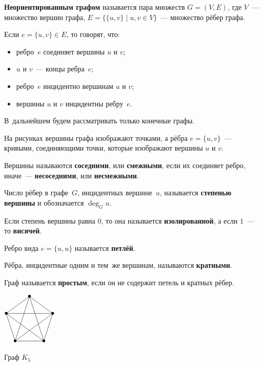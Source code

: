 \textbf{Неориентированным графом} называется пара множеств $G = (V, E)$, где $V$~--- множество вершин графа, $E = \{ \{ u, v \} \mid u, v \in V \}$~--- множество рёбер графа.

Если $e = \{ u, v \} \in E$, то говорят, что:
\begin{itemize}
	\item ребро~$e$ соединяет вершины $u$ и $v$;
	\item $u$ и $v$~--- концы ребра~$e$;
	\item ребро~$e$ инцидентно вершинам $u$ и $v$;
	\item вершины $u$ и $v$ инцидентны ребру~$e$.
\end{itemize}

В~дальнейшем будем рассматривать только конечные графы.

На рисунках вершины графа изображают точками, а рёбра $e = \{ u, v \}$~--- кривыми, соединяющими точки, которые изображают вершины $u$ и $v$.

Вершины называются \textbf{соседними}, или \textbf{смежными}, если их соединяет ребро, иначе~--- \textbf{несоседними}, или \textbf{несмежными}.

 Число рёбер в графе~$G$, инцидентных вершине~$u$, называется \textbf{степенью вершины} и обозначается $\deg_G u$.

Если степень вершины равна $0$, то она называется \textbf{изолированной}, а если $1$~--- то \textbf{висячей}.

 Ребро вида $e = \{ u, u \}$ называется \textbf{петлёй}.

Рёбра, инцидентные одним и тем~же вершинам, называются \textbf{кратными}.

Граф называется \textbf{простым}, если он не содержит петель и кратных рёбер.

\begin{floatingfigure}[r]{30mm} \centering
\noindent
$\begin{xy} /r0.4mm/:
(30, 60) = "1" *{\bullet}; %
(58.532, 39.271) = "2" *{\bullet}; %
(47.634, 5.729) = "3" *{\bullet}; %
(12.366, 5.729) = "4" *{\bullet}; %
(1.468, 39.271) = "5" *{\bullet}; %
"5"; "1" **@{-}; "2" **@{-}; "3" **@{-}; "4" **@{-}; "5" **@{-};
"2" **@{-}; "4" **@{-}; "1" **@{-}; "3" **@{-}; "5" **@{-};
\end{xy}$
\caption{Граф $K_5$}
\end{floatingfigure}

